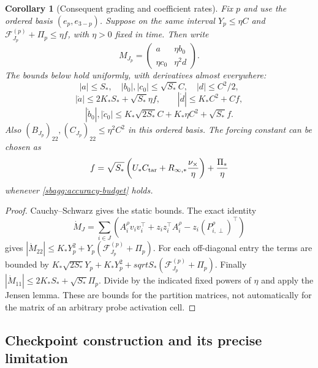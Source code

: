 \documentclass{article} %
\theoremstyle{plain}
\newtheorem{corollary}[theorem]{Corollary}
\theoremstyle{definition}
\theoremstyle{remark}
\begin{document}
\begin{corollary}[Consequent grading and coefficient rates]
\label{sbagg:rates}
Fix $p$ and use the ordered basis $(e_p,e_{3-p})$. Suppose on the same
interval $Y_p\le\eta C$ and $\mathcal F_{J_p}^{(p)}+\Pi_p\le\eta f$,
with $\eta>0$ fixed in time. Then write
\[
 M_{J_p}=\begin{pmatrix}a&\eta b_0\\\eta c_0&\eta^2d\end{pmatrix}.
\]
The bounds below hold uniformly, with derivatives almost everywhere:
\[
 |a|\le S_*,\quad |b_0|,|c_0|\le\sqrt{S_*}C,\quad |d|\le C^2/2,
\]
\[
 |\dot a|\le2K_*S_*+\sqrt{S_*}\eta f,\qquad
 |\dot d|\le K_*C^2+Cf,
\]
\[
 |\dot b_0|,|\dot c_0|
 \le K_*\sqrt{2S_*}C+K_*\eta C^2+\sqrt{S_*}f.
\]
Also $(B_{J_p})_{22},(C_{J_p})_{22}\le\eta^2C^2$ in this ordered basis.
The forcing constant can be chosen as
\[
 f=\sqrt{S_*}\left(U_*C_{\rm tar}
              +R_{\infty,*}\frac{\nu_\times}{\eta}\right)
       +\frac{\Pi_*}{\eta}
\]
whenever \eqref{sbagg:accuracy-budget} holds.
\end{corollary}
\begin{proof}
Cauchy--Schwarz gives the static bounds. The exact identity
\[
 \dot M_J=\sum_{i\in J}
 \left(A_i^\rho v_iv_i^\top+z_iz_i^\top A_i^\rho
                         -z_i(P_{i,\perp}^\rho)^\top\right)
\]
gives
$|\dot M_{22}|\le K_*Y_p^2+Y_p(\mathcal F_{J_p}^{(p)}+\Pi_p)$.
For each off-diagonal entry the terms are bounded by
$K_*\sqrt{2S_*}Y_p+K_*Y_p^2+sqrt{S_*}(\mathcal F_{J_p}^{(p)}+\Pi_p)$.
Finally $|\dot M_{11}|\le2K_*S_*+\sqrt{S_*}\Pi_p$.
Divide by the indicated fixed powers of $\eta$ and apply the Jensen lemma.
These are bounds for the partition matrices, not automatically for the
matrix of an arbitrary probe activation cell.
\end{proof}

\subsection{Checkpoint construction and its precise limitation}
\end{document}
